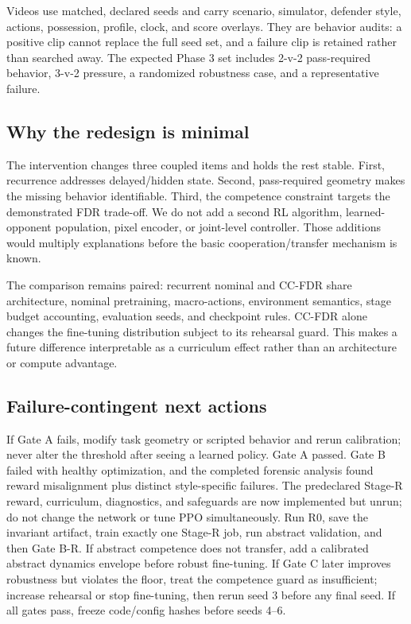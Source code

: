 \documentclass[12pt,twocolumn]{article}
\begin{document}
Videos use matched, declared seeds and carry scenario, simulator, defender style, actions,
possession, profile, clock, and score overlays. They are behavior audits: a positive clip cannot
replace the full seed set, and a failure clip is retained rather than searched away. The expected
Phase 3 set includes 2-v-2 pass-required behavior, 3-v-2 pressure, a randomized robustness case,
and a representative failure.

\subsection{Why the redesign is minimal}
The intervention changes three coupled items and holds the rest stable. First, recurrence addresses
delayed/hidden state. Second, pass-required geometry makes the missing behavior identifiable.
Third, the competence constraint targets the demonstrated FDR trade-off. We do not add a second RL
algorithm, learned-opponent population, pixel encoder, or joint-level controller. Those additions
would multiply explanations before the basic cooperation/transfer mechanism is known.

The comparison remains paired: recurrent nominal and CC-FDR share architecture, nominal
pretraining, macro-actions, environment semantics, stage budget accounting, evaluation seeds, and
checkpoint rules. CC-FDR alone changes the fine-tuning distribution subject to its rehearsal
guard. This makes a future difference interpretable as a curriculum effect rather than an
architecture or compute advantage.

\subsection{Failure-contingent next actions}
If Gate A fails, modify task geometry or scripted behavior and rerun calibration; never alter the
threshold after seeing a learned policy. Gate A passed. Gate B failed with healthy optimization,
and the completed forensic analysis found reward misalignment plus distinct style-specific
failures. The predeclared Stage-R reward, curriculum, diagnostics, and safeguards are now
implemented but unrun; do not change the network or tune PPO simultaneously. Run R0, save the
invariant artifact, train exactly one Stage-R job, run abstract validation, and then Gate B-R.
If abstract competence does not transfer, add a calibrated abstract dynamics envelope before
robust fine-tuning. If Gate C later improves robustness but violates the floor, treat the
competence guard as insufficient; increase rehearsal or stop fine-tuning, then rerun seed 3 before
any final seed. If all gates pass, freeze code/config hashes before seeds 4--6.
\end{document}
